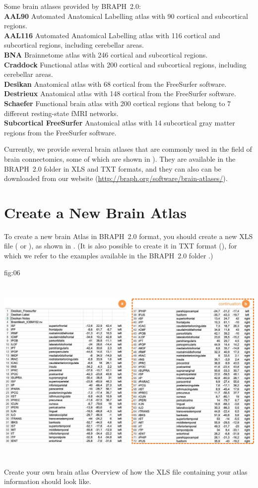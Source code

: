 \documentclass[justified]{tufte-handout}
\begin{document}
	{
	Some brain atlases provided by BRAPH~2.0: \\
	{\bf AAL90} Automated Anatomical Labelling atlas with 90 cortical and subcortical regions.\\
	{\bf AAL116} Automated Anatomical Labelling atlas with 116 cortical and subcortical regions, including cerebellar areas.\\
	{\bf BNA} Brainnetome atlas with 246 cortical and subcortical regions.\\
	{\bf Craddock} Functional atlas with 200 cortical and subcortical regions, including cerebellar areas.\\
	{\bf Desikan} Anatomical atlas with 68 cortical from the FreeSurfer software.\\
	{\bf Destrieux} Anatomical atlas with 148 cortical from the FreeSurfer software.\\
	{\bf Schaefer} Functional brain atlas with 200 cortical regions that belong to 7 different resting-state fMRI networks.\\
	{\bf Subcortical FreeSurfer} Anatomical atlas with 14 subcortical gray matter regions from the FreeSurfer software.
	}

Currently, we provide several brain atlases that are commonly used in the field of brain connectomics, some of which are shown in ). 
They are available in the BRAPH~2.0 folder  in XLS and TXT formats, and they can also can be downloaded from our website (\url{http://braph.org/software/brain-atlases/}).

\clearpage
\section{Create a New Brain Atlas}

To create a new brain Atlas in BRAPH~2.0 format, you should create a new XLS file ( or ), as shown in . 
(It is also possible to create it in TXT format (), for which we refer to the examples available in the BRAPH~2.0 folder .)

	{fig:06}
	{\includegraphics[height=10cm]{fig06.jpg}}
	{Create your own brain atlas}
	{
	Overview of how the XLS file containing your atlas information should look like.
	}
\end{document}
